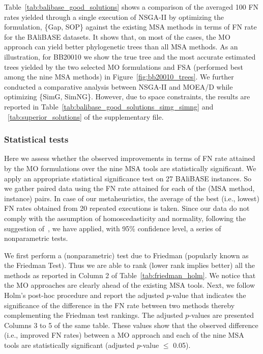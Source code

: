 


Table~\ref{tab:balibase_good_solutions} shows a comparison of the averaged 100 FN rates yielded through a single execution of NSGA-II by optimizing the formulation, \{Gap, SOP\} against the existing MSA methods in terms of FN rate for the BAliBASE datasets. It shows that, on most of the cases, the MO approach can yield better phylogenetic trees than all MSA methods. As an illustration, for BB20010 we show the true tree and the most accurate estimated trees yielded by the two selected MO formulations and FSA (performed best among the nine MSA methods) in Figure~\ref{fig:bb20010_trees}. We further conducted a comparative analysis between NSGA-II and MOEA/D while optimizing \{SimG, SimNG\}. However, due to space constraints, the results are reported in Table~\ref{tab:balibase_good_solutions_simg_simng} and ~\ref{tab:superior_solutions} of the supplementary file.




\subsubsection{Statistical tests}
Here we assess whether the observed improvements in terms of FN rate attained by the MO formulations over the nine  MSA tools are statistically significant.
We apply an appropriate statistical significance test on 27 BAliBASE instances. So we gather paired data using the FN rate attained for each of the (MSA method, instance) pairs. In case of our metaheuristics, the average of the best (i.e., lowest) FN rates obtained from 20 repeated executions is taken. Since our data do not comply with the assumption of homoscedasticity and normality, following the suggestion of~\cite{derrac2011practical}, we have applied, with 95\% confidence level, a series of nonparametric tests.  


We first perform a (nonparametric) test due to Friedman (popularly known as the Friedman Test). Thus we are able to rank (lower rank implies better) all the methods as reported in Column 2 of Table~\ref{tab:friedman_holm}. We notice that the MO approaches are clearly ahead of the existing MSA tools. Next, we follow Holm's post-hoc procedure and report the adjusted $p$-value that indicates the significance of the difference in the FN rate between two methods thereby complementing the Friedman test rankings. The adjusted $p$-values are presented Columns 3 to 5 of the same table. 
These values show that the observed difference (i.e., improved FN rates) between a MO approach and each of the nine MSA tools are statistically significant (adjusted $p$-value $\le$ 0.05).



